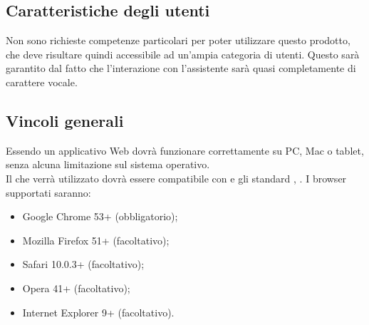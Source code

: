\subsection{Caratteristiche degli utenti}
Non sono richieste competenze particolari per poter utilizzare questo prodotto, che deve risultare
quindi accessibile ad un'ampia categoria di utenti. Questo sarà garantito dal fatto che l'interazione con l'assistente sarà quasi completamente di carattere vocale.
\subsection{Vincoli generali}
Essendo un applicativo Web dovrà funzionare correttamente su PC, Mac o tablet, senza alcuna limitazione sul sistema operativo.\\
Il  che verrà utilizzato dovrà essere compatibile con  e gli standard , .
I browser supportati saranno:
\begin{itemize}
	\item Google Chrome 53+ (obbligatorio);
	\item Mozilla Firefox 51+ (facoltativo);
	\item Safari 10.0.3+ (facoltativo);
	\item Opera 41+ (facoltativo);
	\item Internet Explorer 9+ (facoltativo).
\end{itemize}
